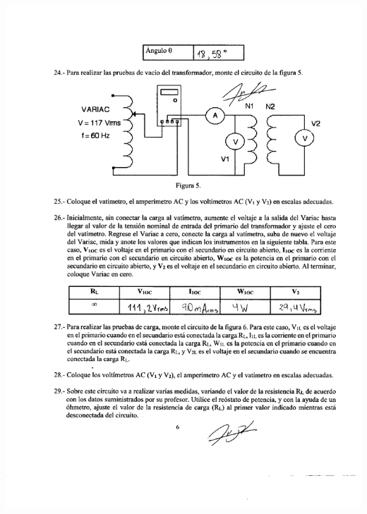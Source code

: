 \documentclass[12pt]{article}
\begin{document}
	\includegraphics[width=16cm,height=21cm]{Img/lab_8_0005}\\
\end{document}

